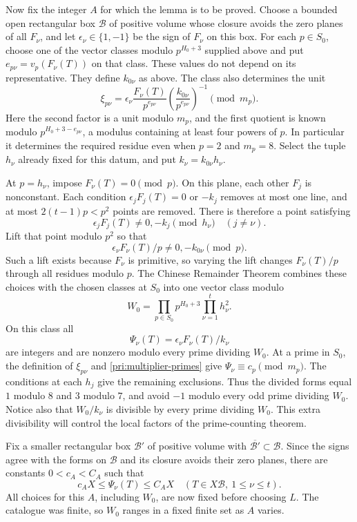 Now fix the integer $A$ for which the lemma is to be proved. Choose a
bounded open rectangular box $\mathcal B$ of positive volume whose
closure avoids the zero planes of all $F_\nu$, and let
$\epsilon_\nu\in\{1,-1\}$ be the sign of $F_\nu$ on this box. For each
$p\in S_0$, choose one of the vector classes modulo $p^{H_0+3}$ supplied
above and put $e_{p\nu}=v_p(F_\nu(T))$ on that class. These values do
not depend on its representative. They define $k_{0\nu}$ as above.
The class also determines the unit
\[
 \xi_{p\nu}=
 \epsilon_\nu\frac{F_\nu(T)}{p^{e_{p\nu}}}
       \left(\frac{k_{0\nu}}{p^{e_{p\nu}}}\right)^{-1}
       \pmod{m_p}.
\]
Here the second factor is a unit modulo $m_p$, and the first quotient
is known modulo $p^{H_0+3-e_{p\nu}}$, a modulus containing at least four
powers of $p$. In particular it determines the required residue even
when $p=2$ and $m_p=8$. Select the tuple $h_\nu$ already fixed for this
datum, and put $k_\nu=k_{0\nu}h_\nu$.

At $p=h_\nu$, impose $F_\nu(T)=0\pmod p$. On this plane, each other
$F_j$ is nonconstant. Each condition
$\epsilon_jF_j(T)=0$ or $-k_j$ removes at most one line, and at most
$2(t-1)p<p^2$ points are removed. There is therefore a point satisfying
\[
          \epsilon_jF_j(T)\ne0,-k_j\pmod{h_\nu}
          \quad(j\ne\nu).
\]
Lift that point modulo $p^2$ so that
\[
                    \epsilon_\nu F_\nu(T)/p
                             \ne0,-k_{0\nu}\pmod p.
\]
Such a lift exists because $F_\nu$ is primitive, so varying the lift
changes $F_\nu(T)/p$ through all residues modulo $p$. The Chinese
Remainder Theorem combines these choices with the chosen classes at
$S_0$ into one vector class modulo
\begin{equation}\label{pri:initial-modulus}
              W_0=\prod_{p\in S_0}p^{H_0+3}
                          \prod_{\nu=1}^t h_\nu^2.
\end{equation}
On this class all
\[
                          \Psi_\nu(T)=\epsilon_\nu F_\nu(T)/k_\nu
\]
are integers and are nonzero modulo every prime dividing $W_0$.
At a prime in $S_0$, the definition of $\xi_{p\nu}$ and
\eqref{pri:multiplier-primes} give $\Psi_\nu\equiv c_p\pmod{m_p}$.
The conditions at each $h_j$ give the remaining exclusions. Thus the
divided forms equal $1$ modulo $8$ and $3$ modulo $7$, and avoid $-1$
modulo every odd prime dividing $W_0$. Notice also that $W_0/k_\nu$ is
divisible by every prime dividing $W_0$. This extra divisibility will
control the local factors of the prime-counting theorem.

Fix a smaller rectangular box $\mathcal B'$ of positive volume with
$\overline{\mathcal B'}\subset\mathcal B$. Since the signs agree with
the forms on $\mathcal B$ and its closure avoids their zero planes,
there are constants $0<c_A<C_A$ such that
\begin{equation}\label{pri:value-range}
        c_AX\le\Psi_\nu(T)\le C_AX
          \quad(T\in X\mathcal B,\ 1\le\nu\le t).
\end{equation}
All choices for this $A$, including $W_0$, are now fixed before choosing
$L$. The catalogue was finite, so $W_0$ ranges in a fixed finite set as
$A$ varies.

